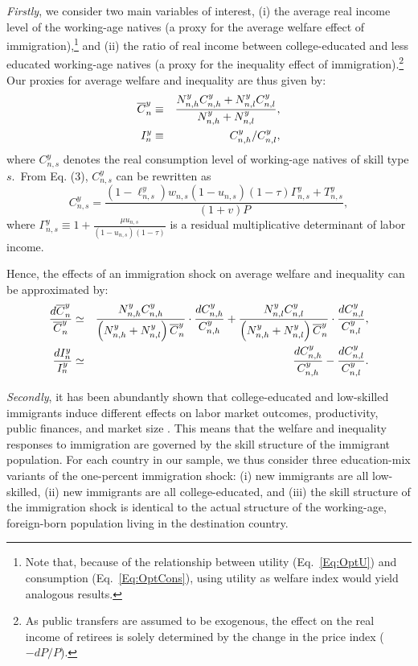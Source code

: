 \documentclass[a4paper,12pt]{article}
\begin{document}
\emph{Firstly}, we consider two main variables of interest, (i) the average
real income level of the working-age natives (a proxy for the average
welfare effect of immigration),\footnote{%
Note that, because of the relationship between utility (Eq.~\ref{Eq:OptU})
and consumption (Eq.~\ref{Eq:OptCons}), using utility as welfare index would
yield analogous results.} and (ii) the ratio of real income between
college-educated and less educated working-age natives (a proxy for the
inequality effect of immigration).\footnote{%
As public transfers are assumed to be exogenous, the effect on the real
income of retirees is solely determined by the change in the price index ($%
-dP/P$).} Our proxies for average welfare and inequality are thus given by:%
\begin{eqnarray*}
\overline{C}_{n}^{y} &\equiv &\frac{%
N_{n,h}^{y}C_{n,h}^{y}+N_{n,l}^{y}C_{n,l}^{y}}{N_{n,h}^{y}+N_{n,l}^{y}}, \\
I_{n}^{y} &\equiv &C_{n,h}^{y}/C_{n,l}^{y},
\end{eqnarray*}%
where $C_{n,s}^{y}$ denotes the real consumption level of working-age
natives of skill type $s$.\ From Eq. (3), $C_{n,s}^{y}$ can be rewritten as%
\begin{equation}
C_{n,s}^{y}=\frac{(1-\ell _{n,s}^{y})w_{n,s}(1-u_{n,s})(1-\tau )\Gamma
_{n,s}^{y}+T_{n,s}^{y}}{(1+v)P},  \label{Eq:ConsMultiplicative}
\end{equation}%
where $\Gamma _{n,s}^{y}\equiv 1+\frac{\mu u_{n,s}}{(1-u_{n,s})(1-\tau )}$
is a residual multiplicative determinant of labor income.

Hence, the effects of an immigration shock on average welfare and inequality
can be approximated by:%
\begin{eqnarray}
\frac{d\overline{C}_{n}^{y}}{\overline{C}_{n}^{y}} &\simeq &\frac{%
N_{n,h}^{y}C_{n,h}^{y}}{\left( N_{n,h}^{y}+N_{n,l}^{y}\right) \overline{C}%
_{n}^{y}}\cdot \frac{dC_{n,h}^{y}}{C_{n,h}^{y}}+\frac{N_{n,l}^{y}C_{n,l}^{y}%
}{\left( N_{n,h}^{y}+N_{n,l}^{y}\right) \overline{C}_{n}^{y}}\cdot \frac{%
dC_{n,l}^{y}}{C_{n,l}^{y}},  \label{Eq:WelfareEffect} \\
\frac{dI_{n}^{y}}{I_{n}^{y}} &\simeq &\frac{dC_{n,h}^{y}}{C_{n,h}^{y}}-\frac{%
dC_{n,l}^{y}}{C_{n,l}^{y}}.  \label{Eq:InequalityEffect}
\end{eqnarray}

\emph{Secondly}, it has been abundantly shown that college-educated and
low-skilled immigrants induce different effects on labor market outcomes,
productivity, public finances, and market size 
\citep[see][]{Borjas2003,
Manacorda2012, Ottaviano2012}. This means that the welfare and inequality
responses to immigration are governed by the skill structure of the
immigrant population. For each country in our sample, we thus consider three
education-mix variants of the one-percent immigration shock: (i) new immigrants are all
low-skilled, (ii) new immigrants are all college-educated, and (iii) the
skill structure of the immigration shock is identical to the actual
structure of the working-age, foreign-born population living in the
destination country.
\end{document}
